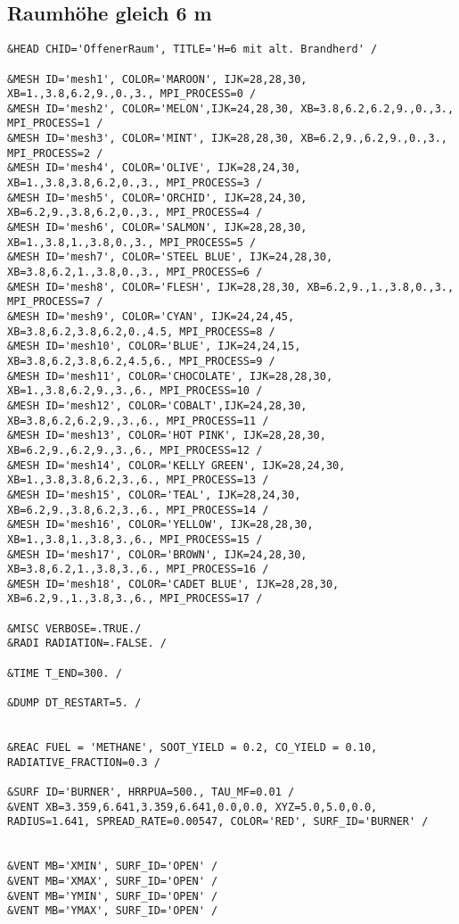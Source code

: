 \subsection*{Raumhöhe gleich 6 m}
\begin{lstlisting}[emptylines=0,basicstyle=\tiny]
&HEAD CHID='OffenerRaum', TITLE='H=6 mit alt. Brandherd' /

&MESH ID='mesh1', COLOR='MAROON', IJK=28,28,30, XB=1.,3.8,6.2,9.,0.,3., MPI_PROCESS=0 /
&MESH ID='mesh2', COLOR='MELON',IJK=24,28,30, XB=3.8,6.2,6.2,9.,0.,3., MPI_PROCESS=1 /
&MESH ID='mesh3', COLOR='MINT', IJK=28,28,30, XB=6.2,9.,6.2,9.,0.,3., MPI_PROCESS=2 /
&MESH ID='mesh4', COLOR='OLIVE', IJK=28,24,30, XB=1.,3.8,3.8,6.2,0.,3., MPI_PROCESS=3 /
&MESH ID='mesh5', COLOR='ORCHID', IJK=28,24,30, XB=6.2,9.,3.8,6.2,0.,3., MPI_PROCESS=4 /
&MESH ID='mesh6', COLOR='SALMON', IJK=28,28,30, XB=1.,3.8,1.,3.8,0.,3., MPI_PROCESS=5 /
&MESH ID='mesh7', COLOR='STEEL BLUE', IJK=24,28,30, XB=3.8,6.2,1.,3.8,0.,3., MPI_PROCESS=6 /
&MESH ID='mesh8', COLOR='FLESH', IJK=28,28,30, XB=6.2,9.,1.,3.8,0.,3., MPI_PROCESS=7 /
&MESH ID='mesh9', COLOR='CYAN', IJK=24,24,45, XB=3.8,6.2,3.8,6.2,0.,4.5, MPI_PROCESS=8 /
&MESH ID='mesh10', COLOR='BLUE', IJK=24,24,15, XB=3.8,6.2,3.8,6.2,4.5,6., MPI_PROCESS=9 /
&MESH ID='mesh11', COLOR='CHOCOLATE', IJK=28,28,30, XB=1.,3.8,6.2,9.,3.,6., MPI_PROCESS=10 /
&MESH ID='mesh12', COLOR='COBALT',IJK=24,28,30, XB=3.8,6.2,6.2,9.,3.,6., MPI_PROCESS=11 /
&MESH ID='mesh13', COLOR='HOT PINK', IJK=28,28,30, XB=6.2,9.,6.2,9.,3.,6., MPI_PROCESS=12 /
&MESH ID='mesh14', COLOR='KELLY GREEN', IJK=28,24,30, XB=1.,3.8,3.8,6.2,3.,6., MPI_PROCESS=13 /
&MESH ID='mesh15', COLOR='TEAL', IJK=28,24,30, XB=6.2,9.,3.8,6.2,3.,6., MPI_PROCESS=14 /
&MESH ID='mesh16', COLOR='YELLOW', IJK=28,28,30, XB=1.,3.8,1.,3.8,3.,6., MPI_PROCESS=15 /
&MESH ID='mesh17', COLOR='BROWN', IJK=24,28,30, XB=3.8,6.2,1.,3.8,3.,6., MPI_PROCESS=16 /
&MESH ID='mesh18', COLOR='CADET BLUE', IJK=28,28,30, XB=6.2,9.,1.,3.8,3.,6., MPI_PROCESS=17 /

&MISC VERBOSE=.TRUE./
&RADI RADIATION=.FALSE. /

&TIME T_END=300. /

&DUMP DT_RESTART=5. /


&REAC FUEL = 'METHANE', SOOT_YIELD = 0.2, CO_YIELD = 0.10, RADIATIVE_FRACTION=0.3 /

&SURF ID='BURNER', HRRPUA=500., TAU_MF=0.01 /
&VENT XB=3.359,6.641,3.359,6.641,0.0,0.0, XYZ=5.0,5.0,0.0, RADIUS=1.641, SPREAD_RATE=0.00547, COLOR='RED', SURF_ID='BURNER' /


&VENT MB='XMIN', SURF_ID='OPEN' /  
&VENT MB='XMAX', SURF_ID='OPEN' /  
&VENT MB='YMIN', SURF_ID='OPEN' /  
&VENT MB='YMAX', SURF_ID='OPEN' / 


\end{lstlisting}
